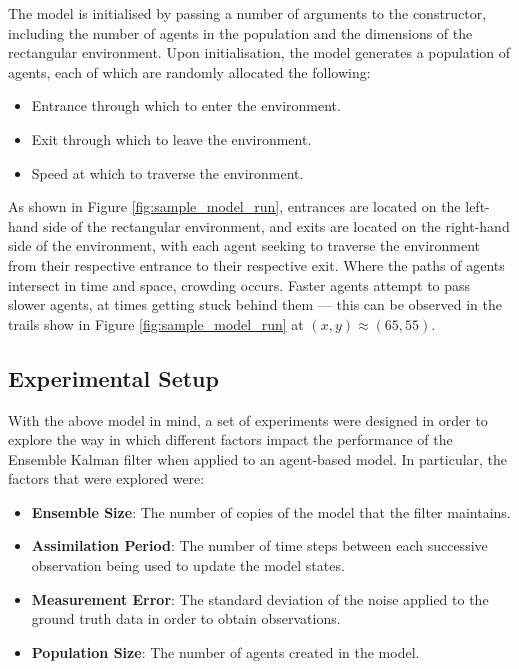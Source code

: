 The model is initialised by passing a number of arguments to the constructor,
including the number of agents in the population and the dimensions of the
rectangular environment.
Upon initialisation, the model generates a population of agents, each of which
are randomly allocated the following:
\begin{itemize}
    \item Entrance through which to enter the environment.
    \item Exit through which to leave the environment.
    \item Speed at which to traverse the environment.
\end{itemize}
As shown in Figure \ref{fig:sample_model_run}, entrances are located on the
left-hand side of the rectangular environment, and exits are located on the
right-hand side of the environment, with each agent seeking to traverse the
environment from their respective entrance to their respective exit.
Where the paths of agents intersect in time and space, crowding occurs.
Faster agents attempt to pass slower agents, at times getting stuck behind them
--- this can be observed in the trails show in Figure \ref{fig:sample_model_run}
at $(x, y) \approx (65, 55)$.

\subsection{Experimental Setup}\label{sub:method:experiments}

With the above model in mind, a set of experiments were designed in order to
explore the way in which different factors impact the performance of the
Ensemble Kalman filter when applied to an agent-based model.
In particular, the factors that were explored were:
\begin{itemize}
    \item \textbf{Ensemble Size}: The number of copies of the model that the
        filter maintains.
    \item \textbf{Assimilation Period}: The number of time steps between each
        successive observation being used to update the model states.
    \item \textbf{Measurement Error}: The standard deviation of the noise
        applied to the ground truth data in order to obtain observations.
    \item \textbf{Population Size}: The number of agents created in the model.
\end{itemize}

